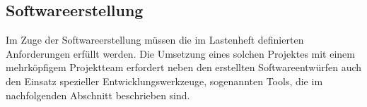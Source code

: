 \subsection{Softwareerstellung}
\label{sec:Softwareerstellung}

Im Zuge der Softwareerstellung müssen die im Lastenheft definierten
Anforderungen erfüllt werden. Die Umsetzung eines solchen Projektes mit einem
mehrköpfigem Projektteam erfordert neben den erstellten Softwareentwürfen auch
den Einsatz spezieller Entwicklungswerkzeuge, sogenannten Tools, die im
nachfolgenden Abschnitt beschrieben sind.




